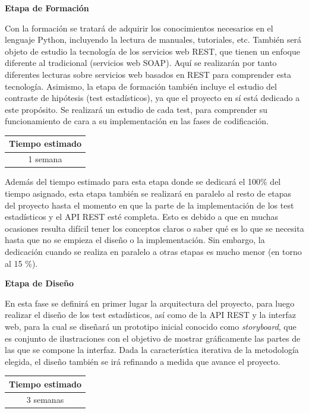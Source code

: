 \noindent
\textbf{Etapa de Formación}

Con la formación se tratará de adquirir los conocimientos necesarios en el lenguaje Python, incluyendo la lectura de manuales, tutoriales, etc. También será objeto de estudio la tecnología de los servicios web REST, que tienen un enfoque diferente al tradicional (servicios web SOAP). Aquí se realizarán por tanto diferentes lecturas sobre servicios web basados en REST para comprender esta tecnología. Asimismo, la etapa de formación también incluye el estudio del contraste de hipótesis (test estadísticos), ya que el proyecto en sí está dedicado a este propósito. Se realizará un estudio de cada test, para comprender su funcionamiento de cara a su implementación en las fases de codificación.

\begin{table}[H]
	\centering
	\begin{tabular}{|c|}
		\hline
		\textbf{Tiempo estimado} \\ \hline
		1 semana \\ \hline
	\end{tabular}
\end{table}

Además del tiempo estimado para esta etapa donde se dedicará el 100\% del tiempo asignado, esta etapa también se realizará en paralelo al resto de etapas del proyecto hasta el momento en que la parte de la implementación de los test estadísticos y el API REST esté completa. Esto es debido a que en muchas ocasiones resulta difícil tener los conceptos claros o saber qué es lo que se necesita hasta que no se empieza el diseño o la implementación. Sin embargo, la dedicación cuando se realiza en paralelo a otras etapas es mucho menor (en torno al 15 \%).

\noindent
\textbf{Etapa de Diseño}

En esta fase se definirá en primer lugar la arquitectura del proyecto, para luego realizar el diseño de los test estadísticos, así como de la API REST y la interfaz web, para la cual se diseñará un prototipo inicial conocido como \textit{storyboard}, que es conjunto de ilustraciones con el objetivo de mostrar gráficamente las partes de las que se compone la interfaz. Dada la característica iterativa de la metodología elegida, el diseño también se irá refinando a medida que avance el proyecto.

\begin{table}[H]
	\centering
	\begin{tabular}{|c|}
		\hline
		\textbf{Tiempo estimado} \\ \hline
		3 semanas \\ \hline
	\end{tabular}
\end{table}

